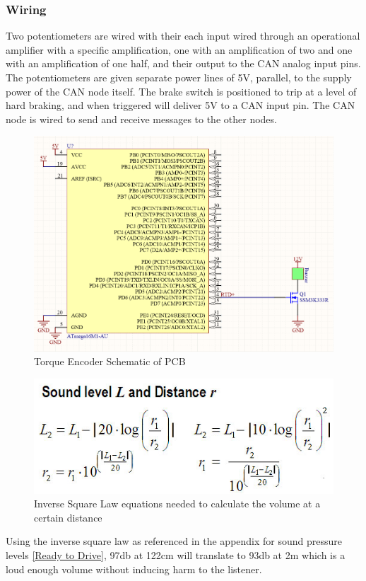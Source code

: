 \documentclass{article}
\begin{document}
\subsubsection{Wiring}
Two potentiometers are wired with their each input wired through an operational amplifier with a specific amplification, one with an amplification of two and one with an amplification of one half, and their output to the CAN analog input pins. The potentiometers are given separate power lines of 5V, parallel, to the supply power of the CAN node itself. The brake switch is positioned to trip at a level of hard braking, and when triggered will deliver 5V to a CAN input pin. The CAN node is wired to send and receive messages to the other nodes. 


\begin{figure}[h]
	\includegraphics[width=\linewidth]{RTDS_Schematic_Simplified}
	\caption{Torque Encoder Schematic of PCB}
\end{figure}
\begin{figure}[H]
	\includegraphics[width=\linewidth]{FormulasForDistanceAndSoundLevel}
	\caption{Inverse Square Law equations needed to calculate the volume at a certain distance}
\end{figure}
Using the inverse square law as referenced in the appendix  for sound pressure levels \ref{Ready to Drive}, 97db at 122cm will translate to 93db at 2m which is a loud enough volume without inducing harm to the listener. 
\end{document}
